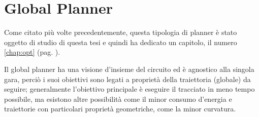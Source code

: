 \section{Global Planner}
Come citato più volte precedentemente, questa tipologia di planner è stato oggetto di studio di questa
tesi e quindi ha dedicato un capitolo, il numero \ref{chap:opt} (pag. \pageref{chap:opt}).

Il global planner ha una visione d'insieme del circuito ed è agnostico alla singola gara, perciò i suoi
obiettivi sono legati a proprietà della traiettoria (globale) da seguire; generalmente l'obiettivo
principale è eseguire il tracciato in meno tempo possibile, ma esistono altre possibilità come il minor
consumo d'energia e traiettorie con particolari proprietà geometriche, come la minor curvatura.

